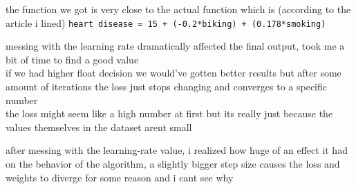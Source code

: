 \documentclass[a4paper,12pt]{article}
\begin{document}
the function we got is very close to the actual function which is (according to the article i lined) \texttt{heart disease = 15 + (-0.2*biking) + (0.178*smoking)}\\
\begin{note}
messing with the learning rate dramatically affected the final output, took me a bit of time to find a good value\\
if we had higher float decision we would've gotten better results but after some amount of iterations the loss just stops changing and converges to a specific number\\
the loss might seem like a high number at first but its really just because the values themselves in the dataset arent small\\
\end{note}
\begin{note}
after messing with the learning-rate value, i realized how huge of an effect it had on the behavior of the algorithm, a slightly bigger step size causes the loss and weights to diverge for some reason and i cant see why\\
\end{note}
\end{document}
